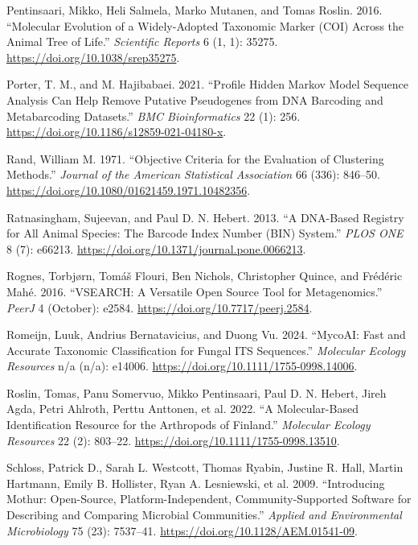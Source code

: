 \documentclass[
]{article}
\newlength{\cslhangindent}
\newenvironment{CSLReferences}[2] %
 {\begin{list}{}{%
  \setlength{\itemindent}{0pt}
  \setlength{\leftmargin}{0pt}
  \setlength{\parsep}{0pt}
  \ifodd #1
   \setlength{\leftmargin}{\cslhangindent}
   \setlength{\itemindent}{-1\cslhangindent}
  \fi
  \setlength{\itemsep}{#2\baselineskip}}}
 {\end{list}}
\begin{document}
\begin{CSLReferences}{1}{0}
Pentinsaari, Mikko, Heli Salmela, Marko Mutanen, and Tomas Roslin. 2016. {``Molecular Evolution of a Widely-Adopted Taxonomic Marker ({COI}) Across the Animal Tree of Life.''} \emph{Scientific Reports} 6 (1, 1): 35275. \url{https://doi.org/10.1038/srep35275}.

Porter, T. M., and M. Hajibabaei. 2021. {``Profile Hidden {Markov} Model Sequence Analysis Can Help Remove Putative Pseudogenes from {DNA} Barcoding and Metabarcoding Datasets.''} \emph{BMC Bioinformatics} 22 (1): 256. \url{https://doi.org/10.1186/s12859-021-04180-x}.

Rand, William M. 1971. {``Objective {Criteria} for the {Evaluation} of {Clustering Methods}.''} \emph{Journal of the American Statistical Association} 66 (336): 846--50. \url{https://doi.org/10.1080/01621459.1971.10482356}.

Ratnasingham, Sujeevan, and Paul D. N. Hebert. 2013. {``A {DNA-Based Registry} for {All Animal Species}: {The Barcode Index Number} ({BIN}) {System}.''} \emph{PLOS ONE} 8 (7): e66213. \url{https://doi.org/10.1371/journal.pone.0066213}.

Rognes, Torbjørn, Tomáš Flouri, Ben Nichols, Christopher Quince, and Frédéric Mahé. 2016. {``{VSEARCH}: A Versatile Open Source Tool for Metagenomics.''} \emph{PeerJ} 4 (October): e2584. \url{https://doi.org/10.7717/peerj.2584}.

Romeijn, Luuk, Andrius Bernatavicius, and Duong Vu. 2024. {``{MycoAI}: {Fast} and Accurate Taxonomic Classification for Fungal {ITS} Sequences.''} \emph{Molecular Ecology Resources} n/a (n/a): e14006. \url{https://doi.org/10.1111/1755-0998.14006}.

Roslin, Tomas, Panu Somervuo, Mikko Pentinsaari, Paul D. N. Hebert, Jireh Agda, Petri Ahlroth, Perttu Anttonen, et al. 2022. {``A Molecular-Based Identification Resource for the Arthropods of {Finland}.''} \emph{Molecular Ecology Resources} 22 (2): 803--22. \url{https://doi.org/10.1111/1755-0998.13510}.

Schloss, Patrick D., Sarah L. Westcott, Thomas Ryabin, Justine R. Hall, Martin Hartmann, Emily B. Hollister, Ryan A. Lesniewski, et al. 2009. {``Introducing Mothur: {Open-Source}, {Platform-Independent}, {Community-Supported Software} for {Describing} and {Comparing Microbial Communities}.''} \emph{Applied and Environmental Microbiology} 75 (23): 7537--41. \url{https://doi.org/10.1128/AEM.01541-09}.


\end{CSLReferences}
\end{document}
